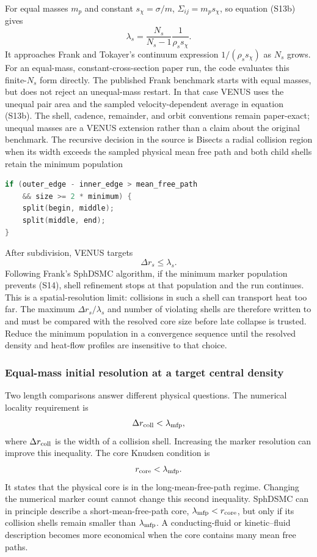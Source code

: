 For equal masses \(m_p\) and constant \(s_\chi=\sigma/m\),
\(\Sigma_{ij}=m_p s_\chi\), so equation (S13b) gives
\[
 \lambda_s=\frac{N_s}{N_s-1}\frac{1}{\rho_s s_\chi}.
\]
It approaches Frank and Tokayer's continuum expression
\(1/(\rho_s s_\chi)\) as \(N_s\) grows.  For an equal-mass,
constant-cross-section paper run, the code evaluates this finite-\(N_s\)
form directly.  The published Frank benchmark starts with equal masses, but
 does not reject an unequal-mass
restart.  In that case VENUS uses the unequal pair area and the sampled
velocity-dependent average in equation (S13b).  The shell, cadence,
remainder, and orbit conventions remain paper-exact; unequal masses are a
VENUS extension rather than a claim about the original benchmark.
The recursive decision in the source is
{}
{Bisects a radial collision region when its width exceeds the sampled physical
 mean free path and both child shells retain the minimum population}
\begin{lstlisting}[language=C++]
if (outer_edge - inner_edge > mean_free_path
    && size >= 2 * minimum) {
    split(begin, middle);
    split(middle, end);
}
\end{lstlisting}

After subdivision, VENUS targets
\[
 \Delta r_s\leq\lambda_s.                                  \tag{S14}
\]
Following Frank's SphDSMC algorithm, if the minimum marker population
prevents (S14), shell refinement stops at that population and the run
continues.  This is a spatial-resolution limit: collisions in such a shell
can transport heat too far.  The maximum \(\Delta r_s/\lambda_s\) and number
of violating shells are therefore written to  and must be
compared with the resolved core size before late collapse is trusted.
Reduce the minimum population in a convergence sequence until the resolved
density and heat-flow profiles are insensitive to that choice.

\subsubsection{Equal-mass initial resolution at a target central density}
\label{sec:sphdsmc-marker-scaling}

Two length comparisons answer different physical questions.  The numerical
locality requirement is
\[
 \Delta r_{\rm coll}<\lambda_{\rm mfp},
\]
where \(\Delta r_{\rm coll}\) is the width of a collision shell.  Increasing
the marker resolution can improve this inequality.  The core Knudsen
condition is
\[
 r_{\rm core}<\lambda_{\rm mfp}.
\]
It states that the physical core is in the long-mean-free-path regime.
Changing the numerical marker count cannot change this second inequality.
SphDSMC can in principle describe a short-mean-free-path core,
\(\lambda_{\rm mfp}<r_{\rm core}\), but only if its collision shells remain
smaller than \(\lambda_{\rm mfp}\).  A conducting-fluid or kinetic--fluid
description becomes more economical when the core contains many mean free
paths.

